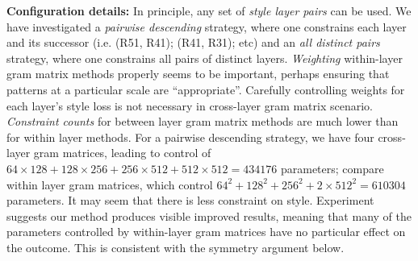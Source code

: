 \documentclass[runningheads]{llncs}
\begin{document}
{\bf Configuration details:}  In principle, any set of {\em style layer pairs} can be used.  We have investigated a {\em pairwise descending}
strategy, where one constrains each layer and its successor (i.e. (R51, R41); (R41, R31); etc) and an {\em all distinct pairs}
strategy, where one constrains all pairs of distinct layers.  {\em Weighting} within-layer gram matrix methods properly
seems to be important, perhaps ensuring that patterns at a particular scale are ``appropriate''.   Carefully controlling
weights for each layer's style loss is not necessary in cross-layer gram matrix scenario.    {\em Constraint counts} for 
between layer gram matrix methods are much lower than for within layer methods.  For a pairwise descending strategy, 
we have four cross-layer gram matrices, leading to  control of $64\times
128+128\times 256+256\times 512+512\times 512 = 434176 $ parameters; compare within layer gram matrices, which control 
$64^2+128^2+256^2+2\times512^2 = 610304$ parameters.  It may seem that there is less constraint on style.  Experiment
suggests our method produces visible improved results, meaning that many of the parameters controlled by within-layer
gram matrices have no particular effect on the outcome.   This is consistent with the symmetry argument below.






\end{document}
